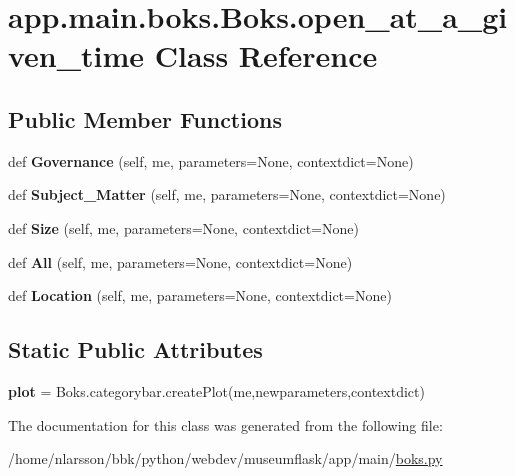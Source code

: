 \hypertarget{classapp_1_1main_1_1boks_1_1Boks_1_1open__at__a__given__time}{}\section{app.\+main.\+boks.\+Boks.\+open\+\_\+at\+\_\+a\+\_\+given\+\_\+time Class Reference}
\label{classapp_1_1main_1_1boks_1_1Boks_1_1open__at__a__given__time}
\subsection*{Public Member Functions}
\begin{DoxyCompactItemize}
\item 
\mbox{\label{classapp_1_1main_1_1boks_1_1Boks_1_1open__at__a__given__time_afdaf1cbfff07ebbeb6f1478a872d9f93}} 
def {\bfseries Governance} (self, me, parameters=None, contextdict=None)
\item 
\mbox{\label{classapp_1_1main_1_1boks_1_1Boks_1_1open__at__a__given__time_a5d4218594c77f274211ab47ab0750740}} 
def {\bfseries Subject\+\_\+\+Matter} (self, me, parameters=None, contextdict=None)
\item 
\mbox{\label{classapp_1_1main_1_1boks_1_1Boks_1_1open__at__a__given__time_af23eb0b7485fbfdec6711e2b693fb6c3}} 
def {\bfseries Size} (self, me, parameters=None, contextdict=None)
\item 
\mbox{\label{classapp_1_1main_1_1boks_1_1Boks_1_1open__at__a__given__time_ad37d4deb536414839684ee82681805ae}} 
def {\bfseries All} (self, me, parameters=None, contextdict=None)
\item 
\mbox{\label{classapp_1_1main_1_1boks_1_1Boks_1_1open__at__a__given__time_a83ee856d6b8ba8e26481b1476e2d1851}} 
def {\bfseries Location} (self, me, parameters=None, contextdict=None)
\end{DoxyCompactItemize}
\subsection*{Static Public Attributes}
\begin{DoxyCompactItemize}
\item 
\mbox{\label{classapp_1_1main_1_1boks_1_1Boks_1_1open__at__a__given__time_a85c47931f8dbf803becac0a56a760dbc}} 
{\bfseries plot} = Boks.\+categorybar.\+create\+Plot(me,newparameters,contextdict)
\end{DoxyCompactItemize}


The documentation for this class was generated from the following file\+:\begin{DoxyCompactItemize}
\item 
/home/nlarsson/bbk/python/webdev/museumflask/app/main/\mbox{\hyperlink{boks_8py}{boks.\+py}}\end{DoxyCompactItemize}
